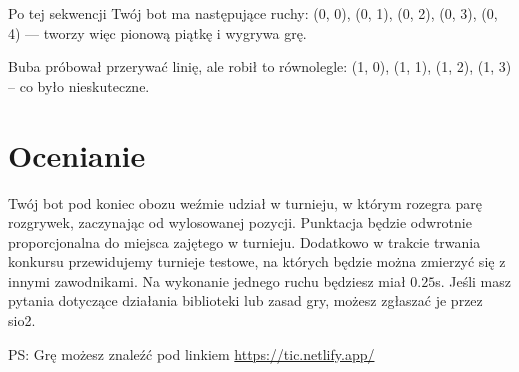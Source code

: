 \documentclass{spiral}
\begin{document}
\bigskip

\noindent
\noindent Po tej sekwencji Twój bot ma następujące ruchy: (0, 0), (0, 1), (0, 2), (0, 3), (0, 4) — tworzy więc pionową piątkę i wygrywa grę.

Buba próbował przerywać linię, ale robił to równolegle: (1, 0), (1, 1), (1, 2), (1, 3) – co było nieskuteczne.



\section{Ocenianie}
\noindent Twój bot pod koniec obozu weźmie udział w turnieju, w którym rozegra parę rozgrywek,
zaczynając od wylosowanej pozycji. Punktacja będzie odwrotnie proporcjonalna do miejsca zajętego w turnieju.
Dodatkowo w trakcie trwania konkursu przewidujemy turnieje testowe, na których będzie można zmierzyć się z innymi zawodnikami.
Na wykonanie jednego ruchu będziesz miał $0.25$s. Jeśli masz pytania dotyczące działania biblioteki lub zasad gry, możesz zgłaszać je przez sio2.


\vfill
\noindent PS: Grę możesz znaleźć pod linkiem \href{https://tic.netlify.app/}{https://tic.netlify.app/}
\end{document}
